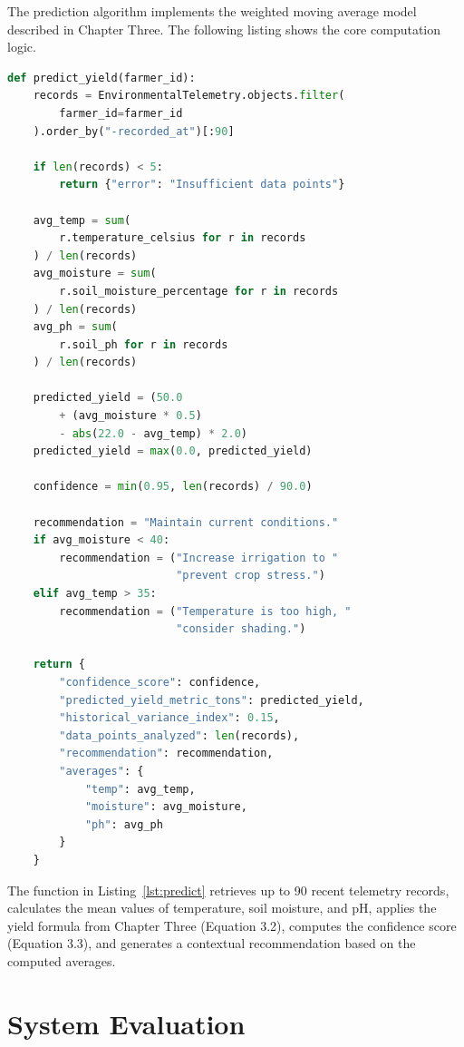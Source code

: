 The prediction algorithm implements the weighted moving average model described in Chapter Three. The following listing shows the core computation logic.

\noindent\begin{minipage}{\textwidth}
\begin{lstlisting}[language=Python, caption={Crop Yield Prediction Service}, label={lst:predict}]
def predict_yield(farmer_id):
    records = EnvironmentalTelemetry.objects.filter(
        farmer_id=farmer_id
    ).order_by("-recorded_at")[:90]

    if len(records) < 5:
        return {"error": "Insufficient data points"}

    avg_temp = sum(
        r.temperature_celsius for r in records
    ) / len(records)
    avg_moisture = sum(
        r.soil_moisture_percentage for r in records
    ) / len(records)
    avg_ph = sum(
        r.soil_ph for r in records
    ) / len(records)

    predicted_yield = (50.0
        + (avg_moisture * 0.5)
        - abs(22.0 - avg_temp) * 2.0)
    predicted_yield = max(0.0, predicted_yield)

    confidence = min(0.95, len(records) / 90.0)

    recommendation = "Maintain current conditions."
    if avg_moisture < 40:
        recommendation = ("Increase irrigation to "
                          "prevent crop stress.")
    elif avg_temp > 35:
        recommendation = ("Temperature is too high, "
                          "consider shading.")

    return {
        "confidence_score": confidence,
        "predicted_yield_metric_tons": predicted_yield,
        "historical_variance_index": 0.15,
        "data_points_analyzed": len(records),
        "recommendation": recommendation,
        "averages": {
            "temp": avg_temp,
            "moisture": avg_moisture,
            "ph": avg_ph
        }
    }
\end{lstlisting}
\end{minipage}

The function in Listing~\ref{lst:predict} retrieves up to 90 recent telemetry records, calculates the mean values of temperature, soil moisture, and pH, applies the yield formula from Chapter Three (Equation 3.2), computes the confidence score (Equation 3.3), and generates a contextual recommendation based on the computed averages.

\section{System Evaluation}

